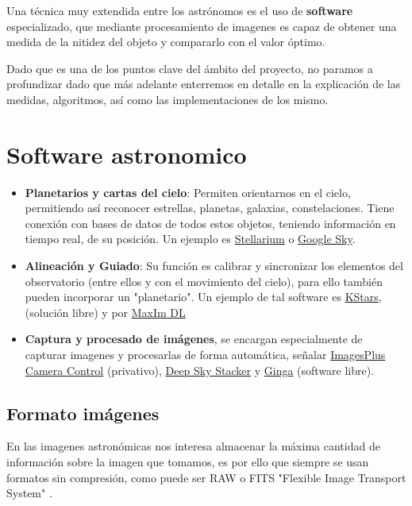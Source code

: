 \begin{itemize}
\begin{itemize}
Una técnica muy extendida entre los astrónomos es el uso de \textbf{software} especializado, que mediante procesamiento de imagenes es capaz de obtener una medida de la nitidez del objeto y compararlo con el valor óptimo.

\bigskip
Dado que es una de los puntos clave del ámbito del proyecto, no paramos a profundizar dado que más adelante enterremos en detalle en la explicación de las medidas, algoritmos, así como las implementaciones de los mismo.


\section{Software astronomico}

\begin{itemize}
	\item \textbf{Planetarios y cartas del cielo}: Permiten orientarnos en el cielo, permitiendo así reconocer estrellas, planetas, galaxias, constelaciones. Tiene conexión con bases de datos de todos estos objetos, teniendo información en tiempo real, de su posición. Un ejemplo es \href{http://www.stellarium.org/es/}{Stellarium} o \href{https://www.google.com/intl/es_es/sky/}{Google Sky}.
	
	\item \textbf{Alineación y Guiado}: Su función es calibrar y sincronizar los elementos del observatorio (entre ellos y con el movimiento del cielo), para ello también pueden incorporar un "planetario". Un ejemplo de tal software es \href{https://edu.kde.org/kstars/}{KStars}, (solución libre) y por \href{http://www.cyanogen.com/maxim_main.php}{MaxIm DL}
	
	\item \textbf{Captura y procesado de imágenes}, se encargan especialmente de capturar imagenes y procesarlas de forma automática, señalar \href{http://www.mlunsold.com/}{ImagesPlus Camera Control} (privativo), \href{http://deepskystacker.free.fr/spanish/index.html}{Deep Sky Stacker} y \href{https://github.com/ejeschke/ginga}{Ginga} (software libre). 
	
	
\end{itemize}

\subsection{Formato imágenes}

En las imagenes astronómicas nos interesa almacenar la máxima cantidad de información sobre la imagen que tomamos, es por ello que siempre se usan formatos sin compresión, como puede ser RAW \cite{Raw} o FITS "Flexible Image Transport System"  \cite{FITS}.


\end{itemize}
\end{itemize}
